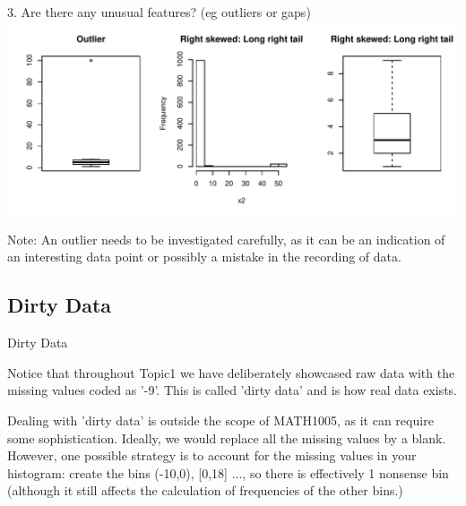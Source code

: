\documentclass[t,xcolor=pdftex,dvipsnames,table]{beamer}
\makeatletter
\def\maxwidth{ %
  \ifdim\Gin@nat@width>\linewidth
    \linewidth
  \else
    \Gin@nat@width
  \fi
}
\newenvironment{knitrout}{}{} %
\makeatother
\begin{document}
\begin{frame}[fragile]{}

3. Are there any unusual features?  (eg outliers or gaps)
\begin{knitrout}
\color{fgcolor}
\includegraphics[width=\maxwidth]{figure/unnamed-chunk-19-1} 

\end{knitrout}


Note: An outlier needs to be investigated carefully, as it can be an indication of an interesting data point or possibly a mistake in the recording of data.
\end{frame}


\subsection[]{Dirty Data}
\begin{frame}[fragile]{Dirty Data}

Notice that throughout Topic1 we have deliberately showcased raw data with the missing values coded as '-9'. This is called 'dirty data' and is how real data exists. 

\vspace{.5cm}
Dealing with 'dirty data' is outside the scope of MATH1005, as it can require some sophistication. Ideally, we would replace all the missing values by a blank. However, one possible strategy is to account for the missing values in your histogram: create the bins (-10,0), [0,18] ..., so there is effectively 1 nonsense bin (although it still affects the calculation of frequencies of the other bins.)
\end{frame}
\end{document}
